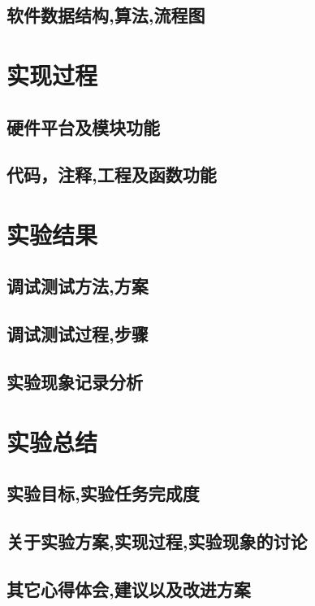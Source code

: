 \documentclass[UTF8]{ctexart}
\begin{document}
\subsection{软件数据结构,算法,流程图}
\section{实现过程}
\subsection{硬件平台及模块功能}
\subsection{代码，注释,工程及函数功能}
\section{实验结果}
\subsection{调试测试方法,方案}
\subsection{调试测试过程,步骤}
\subsection{实验现象记录分析}
\section{实验总结}
\subsection{实验目标,实验任务完成度}
\subsection{关于实验方案,实现过程,实验现象的讨论}
\subsection{其它心得体会,建议以及改进方案}
\end{document}
